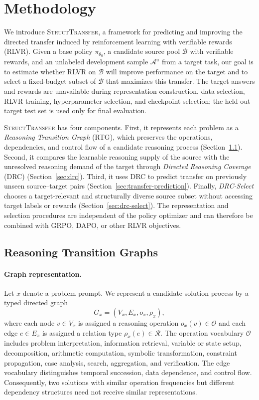 \section{Methodology}
\label{sec:methodology}

We introduce \textsc{StructTransfer}, a framework for predicting and improving the
directed transfer induced by reinforcement learning with verifiable rewards
(RLVR).  Given a base policy $\pi_{\theta_0}$, a candidate source pool
$\mathcal{B}$ with verifiable rewards, and an unlabeled development sample
$\mathcal{A}^{u}$ from a target task, our goal is to estimate whether RLVR on
$\mathcal{B}$ will improve performance on the target and to select a
fixed-budget subset of $\mathcal{B}$ that maximizes this transfer.  The target
answers and rewards are unavailable during representation construction, data
selection, RLVR training, hyperparameter selection, and checkpoint selection;
the held-out target test set is used only for final evaluation.

\textsc{StructTransfer} has four components.  First, it represents each problem
as a \emph{Reasoning Transition Graph} (RTG), which preserves the operations,
dependencies, and control flow of a candidate reasoning process
(Section~\ref{sec:rtg}).  Second, it compares the learnable reasoning supply of
the source with the unresolved reasoning demand of the target through
\emph{Directed Reasoning Coverage} (DRC)
(Section~\ref{sec:drc}).  Third, it uses DRC to predict transfer on previously
unseen source--target pairs (Section~\ref{sec:transfer-prediction}).  Finally,
\emph{DRC-Select} chooses a target-relevant and structurally diverse source
subset without accessing target labels or rewards
(Section~\ref{sec:drc-select}).  The representation and selection procedures
are independent of the policy optimizer and can therefore be combined with
GRPO, DAPO, or other RLVR objectives.

\subsection{Reasoning Transition Graphs}
\label{sec:rtg}

\paragraph{Graph representation.}
Let $x$ denote a problem prompt.  We represent a candidate solution process by
a typed directed graph
\begin{equation}
    G_x = (V_x, E_x, o_x, \rho_x),
\end{equation}
where each node $v\in V_x$ is assigned a reasoning operation
$o_x(v)\in\mathcal{O}$ and each edge $e\in E_x$ is assigned a relation type
$\rho_x(e)\in\mathcal{R}$.  The operation vocabulary $\mathcal{O}$ includes
problem interpretation, information retrieval, variable or state setup,
decomposition, arithmetic computation, symbolic transformation, constraint
propagation, case analysis, search, aggregation, and verification.  The edge
vocabulary distinguishes temporal succession, data dependence, and control
flow.  Consequently, two solutions with similar operation frequencies but
different dependency structures need not receive similar representations.

